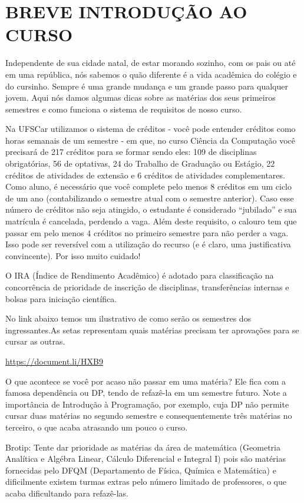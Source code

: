 \section{BREVE INTRODUÇÃO AO CURSO}
Independente de sua cidade natal, de estar morando sozinho, com os pais ou até em uma república, nós sabemos o quão diferente é a vida acadêmica do colégio e do cursinho. Sempre é uma grande mudança e um grande passo para qualquer jovem. Aqui nós damos algumas dicas sobre as matérias dos seus primeiros semestres e como funciona o sistema de requisitos de nosso curso.

Na UFSCar utilizamos o sistema de créditos - você pode entender créditos como horas semanais de um semestre - em que, no curso Ciência da Computação você precisará de 217 créditos para se formar sendo eles: 109 de disciplinas obrigatórias, 56 de optativas, 24 do Trabalho de Graduação ou Estágio, 22 créditos de atividades de extensão e 6 créditos de atividades complementares. Como aluno, é necessário que você complete pelo menos 8 créditos em um ciclo de um ano (contabilizando o semestre atual com o semestre anterior). Caso esse número de créditos não seja atingido, o estudante é considerado ``jubilado'' e sua matrícula é cancelada, perdendo a vaga. Além deste requisito, o calouro tem que passar em pelo menos 4 créditos no primeiro semestre para não perder a vaga. Isso pode ser reversível com a utilização do recurso (e é claro, uma justificativa convincente). Por isso muito cuidado!

O IRA (Índice de Rendimento Acadêmico) é adotado para classificação na concorrência de prioridade de inscrição de disciplinas, transferências internas e bolsas para iniciação científica.

No link abaixo temos um ilustrativo de como serão os semestres dos ingressantes.As setas representam quais matérias precisam ter aprovações para se cursar as outras.

\url{https://document.li/HXB9}

O que acontece se você por acaso não passar em uma matéria? Ele fica com a
famosa dependência ou DP, tendo de refazê-la em um semestre futuro. Note a
importância de Introdução à Programação, por exemplo, cuja DP não permite
cursar duas matérias no segundo semestre e consequentemente três matérias no terceiro, o que acaba atrasando um pouco o curso.

Brotip: Tente dar prioridade as matérias da área de matemática (Geometria Analítica e Algébra Linear, Cálculo Diferencial e Integral I) pois são matérias fornecidas pelo DFQM (Departamento de Física, Química e Matemática)
e dificilmente existem turmas extras pelo número limitado de professores, o que acaba dificultando para refazê-las.
